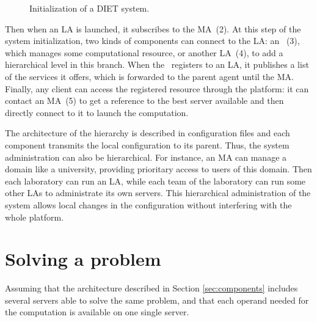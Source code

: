 \begin{figure}[hbt]
  \begin{center}
    \caption{Initialization of a DIET system.}
    \label{fig:init}
  \end{center}
\end{figure}

Then when an LA is launched, it subscribes to the MA~(2). At this step of the
system initialization, two kinds of components can connect to the LA: an
\sed ~(3), which manages some computational resource, or another LA~(4), to add a
hierarchical level in this branch. When the \sed\ registers to an LA, it
publishes a list of the services it offers, which is forwarded to the parent
agent until the MA.
Finally, any client can access the registered resource through the platform: it
can contact an MA~(5) to get a reference to the best server available and then
directly connect to it to launch the computation.

The architecture of the hierarchy is described in configuration files and each
component transmits the local configuration to its parent. Thus, the system
administration can also be hierarchical. For instance, an MA can manage a domain
like a university, providing prioritary access to users of this domain. Then
each laboratory can run an LA, while each team of the laboratory can run some
other LAs to administrate its own servers. This hierarchical administration of
the system allows local changes in the configuration without interfering with
the whole platform.



\section{Solving a problem}
\label{sec:solvepb}

Assuming that the architecture described in Section \ref{sec:components}
includes several servers able to solve the same problem, and that each operand
needed for the computation is available on one single server.


